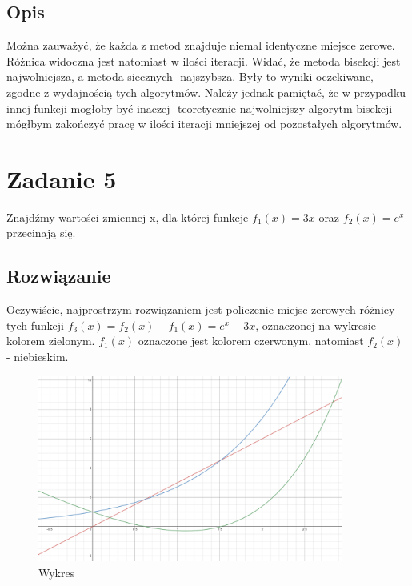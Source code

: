 \documentclass[12pt]{article}
\begin{document}
\subsection{Opis}
Można zauważyć, że każda z metod znajduje niemal identyczne miejsce zerowe. Różnica widoczna jest natomiast w ilości iteracji. Widać, że metoda bisekcji jest najwolniejsza, a metoda siecznych- najszybsza. Były to wyniki oczekiwane, zgodne z wydajnością tych algorytmów. Należy jednak pamiętać, że w przypadku innej funkcji mogłoby być inaczej- teoretycznie najwolniejszy algorytm bisekcji mógłbym zakończyć pracę w ilości iteracji mniejszej od pozostałych algorytmów.

\section{Zadanie 5}
Znajdźmy wartości zmiennej x, dla której funkcje $f_1(x) = 3x$ oraz $f_2(x) = e^x$ przecinają się.
\subsection{Rozwiązanie}
Oczywiście, najprostrzym rozwiązaniem jest policzenie miejsc zerowych różnicy tych funkcji $f_3(x) = f_2(x)-f_1(x) = e^x-3x$, oznaczonej na wykresie kolorem zielonym. $f_1(x)$ oznaczone jest kolorem czerwonym, natomiast $f_2(x)$ - niebieskim.
\begin{figure}[!htbp]
    \centering
    \includegraphics[width=380px]{graph.png}
    \caption{Wykres}
    \label{fig:secant}
\end{figure}
\end{document}
